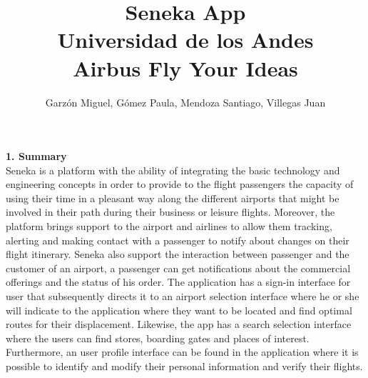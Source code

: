 \documentclass[]{article}
\begin{document}
\title{Seneka App\\
Universidad de los Andes\\
Airbus Fly Your Ideas}
\author{Garzón Miguel, Gómez Paula, Mendoza Santiago, Villegas Juan}
\maketitle


\Large{
\textbf{1. Summary}\\
}
Seneka is a platform with the ability of integrating the basic technology and engineering concepts in order to provide to the flight passengers the capacity of using their time in a pleasant way along the different airports that might be involved in their path during their business or leisure flights. Moreover, the platform brings support to the airport and airlines to allow them tracking, alerting and making contact with a passenger to notify about changes on their flight itinerary. Seneka also support the interaction between passenger and the customer of an airport, a passenger can get notifications about the commercial offerings and the status of his order. The application has a sign-in interface for user that subsequently directs it to an airport selection interface where he or she will indicate to the application where they want to be located and find optimal routes for their displacement. Likewise, the app has a search selection interface where the users can find stores, boarding gates and places of interest. Furthermore, an user profile interface can be found in the application where it is possible to identify and modify their personal information and verify their flights.\\
\end{document}
